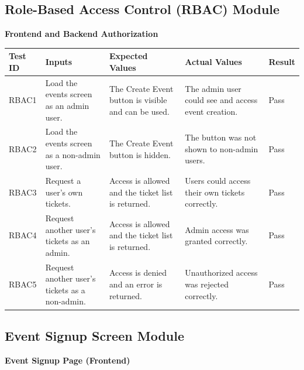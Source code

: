 \documentclass[12pt, titlepage]{article}
\begin{document}
\subsection{Role-Based Access Control (RBAC) Module}

\textbf{Frontend and Backend Authorization}

{\small
\setlength{\tabcolsep}{4pt}
\begin{tabularx}{\textwidth}{L{1.6cm}Y Y Y L{1.4cm}}
\toprule
\textbf{Test ID} & \textbf{Inputs} & \textbf{Expected Values} & \textbf{Actual Values} & \textbf{Result} \\
\midrule
RBAC1 & Load the events screen as an admin user. & The Create Event button is visible and can be used. & The admin user could see and access event creation. & Pass \\
RBAC2 & Load the events screen as a non-admin user. & The Create Event button is hidden. & The button was not shown to non-admin users. & Pass \\
RBAC3 & Request a user's own tickets. & Access is allowed and the ticket list is returned. & Users could access their own tickets correctly. & Pass \\
RBAC4 & Request another user's tickets as an admin. & Access is allowed and the ticket list is returned. & Admin access was granted correctly. & Pass \\
RBAC5 & Request another user's tickets as a non-admin. & Access is denied and an error is returned. & Unauthorized access was rejected correctly. & Pass \\
\bottomrule
\end{tabularx}
}

\subsection{Event Signup Screen Module}

\textbf{Event Signup Page (Frontend)}
\end{document}
